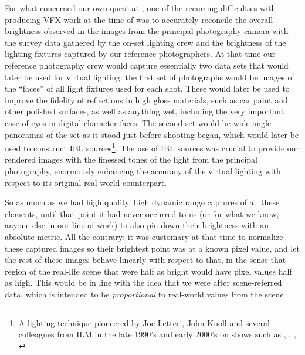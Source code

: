 For what concerned our own quest at , one of the recurring difficulties with 
producing \gls{VFX} work at the time of \cite{hobbit3} was to accurately reconcile 
the overall brightness observed in the images from the principal photography camera
with the survey data gathered by the on-set lighting crew and
the brightness of the lighting fixtures captured by our reference photographers.
At that time our reference photography crew would capture essentially two data sets
that would later be used for \gls{virtual} lighting: the first set of photographs would be 
images of the ``faces'' of all light fixtures used for each shot. 
These would later be used to improve the fidelity of reflections in high
gloss materials, such as car paint and other polished surfaces, as well as anything wet, 
including the very important case of eyes in digital character faces. 
The second set would be wide-angle panoramas of the set as it stood just before shooting began,
which would later be used to construct \gls{IBL} sources\footnote{ 
	A lighting technique pioneered by Joe Letteri, John Knoll and several colleagues from
	\gls{ILM} in the late 1990's and early 2000's on shows such as 
	\cite{casper95}, \cite{speed297}, \cite{pearlharbor2001}, \cite{lotr-tri}}. 
The use of \gls{IBL} sources was crucial to provide our rendered images with the finessed tones 
of the light from the principal photography, enormously enhancing the accuracy of the \gls{virtual}
lighting with respect to its original real-world counterpart.

So as much as we had high quality, high dynamic range captures of all these elements,
until that point it had never occurred to us (or for what we know, anyone else in our
line of work) to also pin down their brightness with an absolute metric. 
All the contrary: it was customary at that time to normalize these captured images so their 
brightest point was at a known pixel value, and let the rest of these images behave linearly 
with respect to that, in the sense that region of the real-life scene that were half as bright
would have pixel values half as high. This would be in line with the idea that we were after 
\gls{scene-referred} data, which is intended to be \emph{proportional} to real-world values from
the scene~\cite{iso:12231-2:2022,iso:22028-1:2016,iec:60050-845:2020,icc:glossary}.

